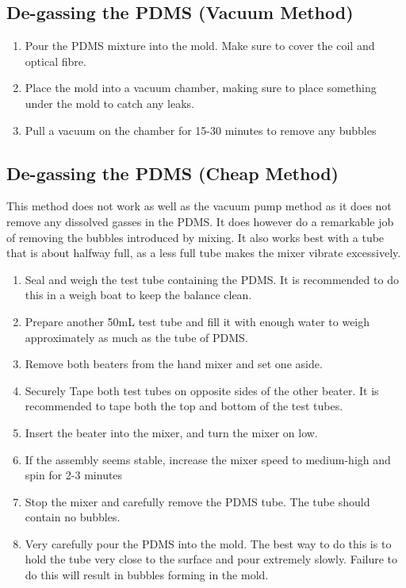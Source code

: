 \documentclass[10pt, journal]{IEEEtran}
\begin{document}
\subsection{De-gassing the PDMS (Vacuum Method)}
\begin{enumerate}
  \item Pour the PDMS mixture into the mold. Make sure to cover the
    coil and optical fibre.
  \item Place the mold into a vacuum chamber, making sure to place
    something under the mold to catch any leaks.
  \item Pull a vacuum on the chamber for 15-30 minutes to remove any bubbles

\end{enumerate}

\subsection{De-gassing the PDMS (Cheap Method)}
This method does not work as well as the vacuum pump method as it does
not remove any dissolved gasses in the PDMS. It does however do a
remarkable job of removing the bubbles introduced by mixing. It also
works best with a tube that is about halfway full, as a less full tube
makes the mixer vibrate excessively.

\begin{enumerate}
\item Seal and weigh the test tube containing the PDMS. It is
  recommended to do this in a weigh boat to keep the balance clean.
\item Prepare another 50mL test tube and fill it with enough water to
  weigh approximately as much as the tube of PDMS.
\item Remove both beaters from the hand mixer and set one aside.
\item Securely Tape both test tubes on opposite sides of the other
  beater. It is recommended to tape both the top and bottom of the
  test tubes.
\item Insert the beater into the mixer, and turn the mixer on low.
\item If the assembly seems stable, increase the mixer speed to
  medium-high and spin for 2-3 minutes
\item Stop the mixer and carefully remove the PDMS tube. The tube
  should contain no bubbles.
\item Very carefully pour the PDMS into the mold. The best way to do
  this is to hold the tube very close to the surface and pour
  extremely slowly. Failure to do this will result in bubbles forming
  in the mold.
\end{enumerate}
\end{document}
